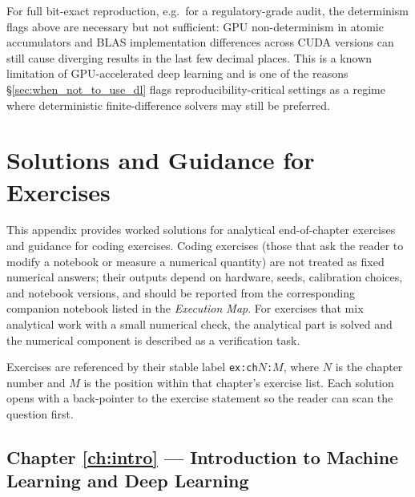 \documentclass[11pt,a4paper]{report}
\begin{document}
For full bit-exact reproduction, e.g.\ for a regulatory-grade audit, the determinism flags above are necessary but not sufficient: GPU non-determinism in atomic accumulators and BLAS implementation differences across CUDA versions can still cause diverging results in the last few decimal places.  This is a known limitation of GPU-accelerated deep learning and is one of the reasons \S\ref{sec:when_not_to_use_dl} flags reproducibility-critical settings as a regime where deterministic finite-difference solvers may still be preferred.

\chapter{Solutions and Guidance for Exercises}
\label{app:solutions}

This appendix provides worked solutions for analytical end-of-chapter exercises and guidance for coding exercises.  Coding exercises (those that ask the reader to modify a notebook or measure a numerical quantity) are not treated as fixed numerical answers; their outputs depend on hardware, seeds, calibration choices, and notebook versions, and should be reported from the corresponding companion notebook listed in the \emph{Execution Map}.  For exercises that mix analytical work with a small numerical check, the analytical part is solved and the numerical component is described as a verification task.

Exercises are referenced by their stable label \texttt{ex:ch$N$:$M$}, where $N$ is the chapter number and $M$ is the position within that chapter's exercise list.  Each solution opens with a back-pointer to the exercise statement so the reader can scan the question first.

\section{Chapter \ref{ch:intro} --- Introduction to Machine Learning and Deep Learning}
\label{sol:ch1}
\end{document}
